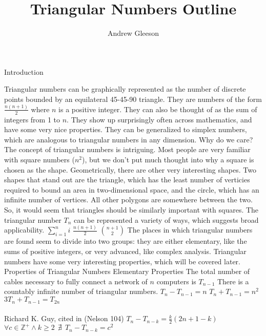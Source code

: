 \documentclass{article}
\begin{document}
\title{Triangular Numbers Outline}
\author{Andrew Gleeson}

\maketitle

\begin{outline}[enumerate]

\1 Introduction  
	
	\2 Triangular numbers can be graphically represented as the number of discrete points bounded by an equilateral 45-45-90 triangle.
	\2  They are numbers of the form $\frac{n(n+1)}{2}$ where $n$ is a positive integer. They can also be thought of as the sum of integers from 1 to $n$.
	\2 They show up surprisingly often across mathematics, and have some very nice properties.
	\2 They can be generalized to simplex numbers, which are analogous to triangular numbers in any dimension.
\1 Why do we care?
	\2 The concept of triangular numbers is intriguing. Most people are very familiar with square numbers ($n^2$), but we don't put much thought into why a square is chosen as the shape. Geometrically, there are other very interesting shapes. Two shapes that stand out are the triangle, which has the least number of verticies required to bound an area in two-dimensional space, and the circle, which has an infinite number of vertices. All other polygons are somewhere between the two. So, it would seem that triangles should be similarly important with squares.
	\2 The triangular number $T_n$ can be represented a variety of ways, which suggests broad applicability.
		\3 $\sum_{i=1}^{n} i$
		\3 $\frac{n(n+1)}{2}$
		\3 ${n+1 \choose 2}$
	\2 The places in which triangular numbers are found seem to divide into two groups: they are either elementary, like the sums of positive integers, or very advanced, like complex analysis.
	\2 Triangular numbers have some very interesting properties, which will be covered later.
	\pagebreak
\1 Properties of Triangular Numbers
	\2 Elementary Properties
		\3 The total number of cables necessary to fully connect a network of $n$ computers is $T_{n-1}$
		\3 There is a countably infinite number of triangular numbers.
		\3 $T_n-T_{n-1} = n$
		\3 $T_n + T_{n-1} = n^2$
		\3 $3T_n + T_{n-1} = T_{2n}$ \\\\ Richard K. Guy, cited in (Nelson 104)
		\3 $T_n - T_{n-k} = \frac{k}{2}(2n+1-k)$
			\4  $\forall c \in \mathbb{Z}^+ \wedge k \ge 2  \:\: \nexists\:\: T_n - T_{n-k}= c^2$\\

\end{outline}
\end{document}
